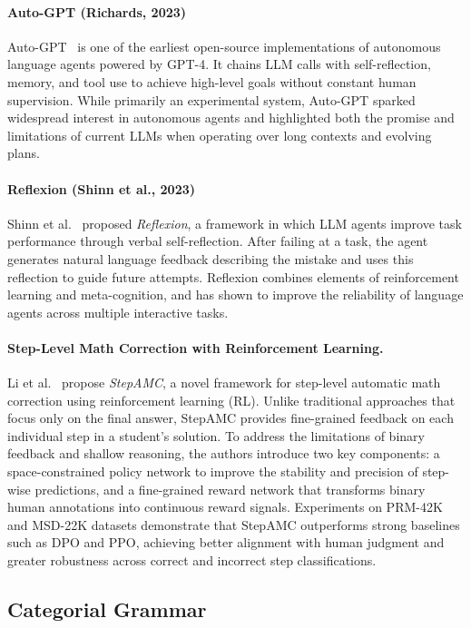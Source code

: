 \paragraph{Auto-GPT (Richards, 2023)}  
Auto-GPT~\cite{torantulino2023autogpt} is one of the earliest open-source implementations of autonomous language agents powered by GPT-4. It chains LLM calls with self-reflection, memory, and tool use to achieve high-level goals without constant human supervision. While primarily an experimental system, Auto-GPT sparked widespread interest in autonomous agents and highlighted both the promise and limitations of current LLMs when operating over long contexts and evolving plans.

\paragraph{Reflexion (Shinn et al., 2023)}  
Shinn et al.~\cite{shinn2023reflexion} proposed \emph{Reflexion}, a framework in which LLM agents improve task performance through verbal self-reflection. After failing at a task, the agent generates natural language feedback describing the mistake and uses this reflection to guide future attempts. Reflexion combines elements of reinforcement learning and meta-cognition, and has shown to improve the reliability of language agents across multiple interactive tasks.

\paragraph{Step-Level Math Correction with Reinforcement Learning.}
Li et al.~\cite{li2025stepamc} propose \textit{StepAMC}, a novel framework for step-level automatic math correction using reinforcement learning (RL). Unlike traditional approaches that focus only on the final answer, StepAMC provides fine-grained feedback on each individual step in a student's solution. To address the limitations of binary feedback and shallow reasoning, the authors introduce two key components: a space-constrained policy network to improve the stability and precision of step-wise predictions, and a fine-grained reward network that transforms binary human annotations into continuous reward signals. Experiments on PRM-42K and MSD-22K datasets demonstrate that StepAMC outperforms strong baselines such as DPO and PPO, achieving better alignment with human judgment and greater robustness across correct and incorrect step classifications.


\subsection{Categorial Grammar}

